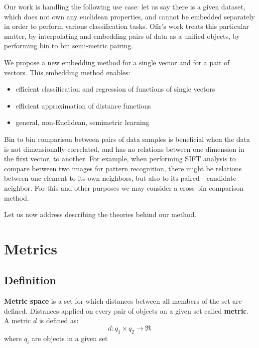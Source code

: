\vskip30pt
Our work is handling the following use case: let us say there is a given dataset, which does not own any euclidean properties, and cannot be embedded separately in order to perform various classification tasks. 
Ofir’s work \cite{ofirpelethesis} treats this particular matter, by interpolating and embedding pairs of data as a unified objects, by performing bin to bin semi-metric pairing.

We propose a new embedding method for a single vector and for a pair
of vectors. This embedding method enables: 
\begin{itemize}[noitemsep]
	\item  efficient classification and regression of functions of single vectors
	\item  efficient approximation of distance functions
	\item  general, non-Euclidean, semimetric learning 
\end{itemize}

Bin to bin comparison between pairs of data samples is beneficial when the data is not dimensionally correlated, and has no relations between one dimension in the first vector, to another. For example, when performing SIFT \cite{brown2007automatic} analysis to compare between two images for pattern recognition, there might be relations between one element to its own neighbors, but also to its paired - candidate neighbor.
For this and other purposes we may consider a cross-bin comparison method.

Let us now address describing the theories behind our method.


\section{Metrics}


\subsection{Definition}

\textbf{Metric space} is a set for which distances between all members of the set are defined. Distances applied on every pair of objects on a given set called \textbf{metric}.
A metric $d$ is defined as:\\
\begin{equation}
d: q_1 \times q_2 \rightarrow \Re
\end{equation}
where $q_i$ are objects in a given set

